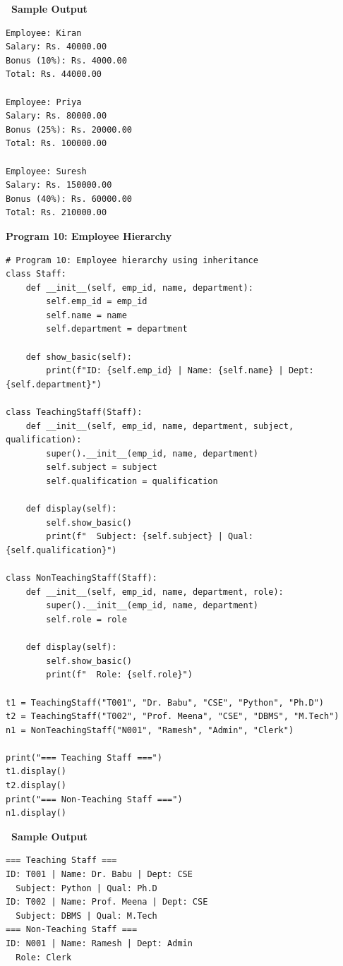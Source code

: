 \documentclass[12pt,a4paper]{article}
\newcommand{\outhead}{\noindent\colorbox{cmrgreen!25}%
  {\textbf{\small\color{cmrdark}~Sample Output~}}\par\vspace{-1pt}}
\begin{document}
\outhead
\begin{lstlisting}[style=outputstyle]
Employee: Kiran
Salary: Rs. 40000.00
Bonus (10%): Rs. 4000.00
Total: Rs. 44000.00

Employee: Priya
Salary: Rs. 80000.00
Bonus (25%): Rs. 20000.00
Total: Rs. 100000.00

Employee: Suresh
Salary: Rs. 150000.00
Bonus (40%): Rs. 60000.00
Total: Rs. 210000.00
\end{lstlisting}

\vspace{0.5cm}

\textbf{Program 10: Employee Hierarchy}

\begin{lstlisting}
# Program 10: Employee hierarchy using inheritance
class Staff:
    def __init__(self, emp_id, name, department):
        self.emp_id = emp_id
        self.name = name
        self.department = department

    def show_basic(self):
        print(f"ID: {self.emp_id} | Name: {self.name} | Dept: {self.department}")

class TeachingStaff(Staff):
    def __init__(self, emp_id, name, department, subject, qualification):
        super().__init__(emp_id, name, department)
        self.subject = subject
        self.qualification = qualification

    def display(self):
        self.show_basic()
        print(f"  Subject: {self.subject} | Qual: {self.qualification}")

class NonTeachingStaff(Staff):
    def __init__(self, emp_id, name, department, role):
        super().__init__(emp_id, name, department)
        self.role = role

    def display(self):
        self.show_basic()
        print(f"  Role: {self.role}")

t1 = TeachingStaff("T001", "Dr. Babu", "CSE", "Python", "Ph.D")
t2 = TeachingStaff("T002", "Prof. Meena", "CSE", "DBMS", "M.Tech")
n1 = NonTeachingStaff("N001", "Ramesh", "Admin", "Clerk")

print("=== Teaching Staff ===")
t1.display()
t2.display()
print("=== Non-Teaching Staff ===")
n1.display()
\end{lstlisting}

\outhead
\begin{lstlisting}[style=outputstyle]
=== Teaching Staff ===
ID: T001 | Name: Dr. Babu | Dept: CSE
  Subject: Python | Qual: Ph.D
ID: T002 | Name: Prof. Meena | Dept: CSE
  Subject: DBMS | Qual: M.Tech
=== Non-Teaching Staff ===
ID: N001 | Name: Ramesh | Dept: Admin
  Role: Clerk
\end{lstlisting}
\end{document}
